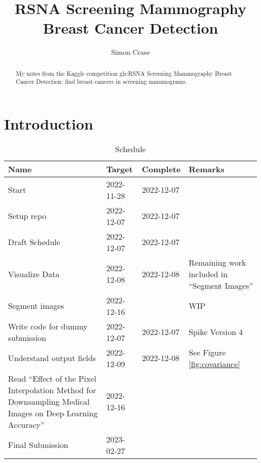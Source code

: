 \documentclass[]{article}
\title{RSNA Screening Mammography Breast Cancer Detection}
\author{Simon Crase}
\begin{document}
\maketitle

\begin{abstract}
My notes from the Kaggle competition \gls{gls:RSNA} Screening Mammography Breast Cancer Detection: find breast cancers in screening mammograms. \cite{rsna-breast-cancer-detection}
\end{abstract}

\setcounter{tocdepth}{2}
\tableofcontents
\listoffigures
\listoftables

\section{Introduction}
\begin{table}[H]
	\begin{center}
		\caption{Schedule}
		\begin{tabular}{|p{4cm}|l|l|p{4cm}|} \hline
			Name&Target&Complete&Remarks \\  \hline
			Start&2022-11-28&2022-12-07&\\ 		 \hline
			Setup repo&2022-12-07&2022-12-07&\\ 		 \hline
			Draft Schedule&2022-12-07&2022-12-07&\\ 		 \hline
			Visualize Data&2022-12-08&2022-12-08&Remaining work included in ``Segment Images''\\ 		 \hline
			Segment images&2022-12-16&&WIP\\ 		 \hline
			Write code for dummy submission&2022-12-07&2022-12-07&Spike Version 4\\ 		 \hline
			Understand output fields&2022-12-09&2022-12-08&See Figure \ref{fig:covariance}\\ \hline
			Read ``Effect of the Pixel Interpolation Method for Downsampling Medical Images on Deep Learning Accuracy'' \cite{hirahara2021effect}&2022-12-16&&\\\hline
			Final Submission&2023-02-27&&\\ 		 \hline
		\end{tabular}
	\end{center}
\end{table}
\end{document}
